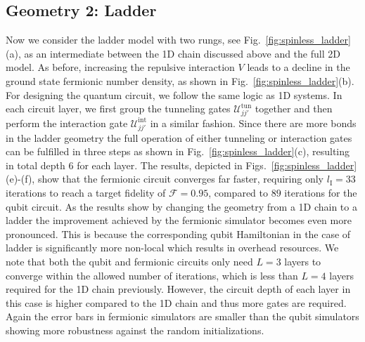 \documentclass[aps, prx, reprint, superscriptaddress]{revtex4-2}
\begin{document}
\subsection{Geometry 2: Ladder }
\label{subsec:spinless_ladder}
Now we consider the ladder model with two rungs, see Fig.~\ref{fig:spinless_ladder}(a),  as an intermediate between the 1D chain discussed above and the full 2D model.
As before, increasing the repulsive interaction $V$ leads to a decline in the ground state fermionic number density, as shown in Fig.~\ref{fig:spinless_ladder}(b). For designing the quantum circuit, we follow the same logic as 1D systems. In each circuit layer, we first group the tunneling gates $\mathcal{U}^\text{tun}_{jj'}$ together and then perform the interaction gate $\mathcal{U}^\text{int}_{jj'}$  in a similar fashion. Since there are more bonds in the ladder geometry the full operation of either tunneling or interaction gates can be fulfilled in three steps as shown in Fig.~\ref{fig:spinless_ladder}(c), resulting in total depth $6$ for each layer. 
The results, depicted in Figs.~\ref{fig:spinless_ladder}(e)-(f), show that the fermionic circuit converges far faster, requiring only $l_\text{I}{=}33$ iterations to reach a target fidelity of $\mathcal{F} {=} 0.95$, compared to $89$ iterations for the qubit circuit. As the results show by changing the geometry from a 1D chain to a ladder the improvement achieved by the fermionic simulator becomes even more pronounced. This is because the corresponding qubit Hamiltonian in the case of ladder is significantly more non-local which results in overhead resources. 
We note that both the qubit and fermionic circuits only need $L{=}3$ layers to converge within the allowed number of iterations,  which is less than $L{=}4$ layers required for the 1D chain previously. However, the circuit depth of each layer in this case is higher compared to the 1D chain and thus more gates are required. Again the error bars in fermionic simulators are smaller than the qubit simulators showing more robustness against the random initializations. 
 
 
\end{document}
